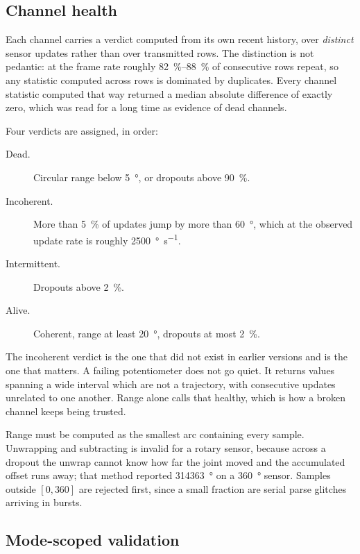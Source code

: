 \subsection{Channel health}

Each channel carries a verdict computed from its own recent history, over
\emph{distinct} sensor updates rather than over transmitted rows. The
distinction is not pedantic: at the frame rate roughly
\SIrange{82}{88}{\percent} of consecutive rows repeat, so any statistic
computed across rows is dominated by duplicates. Every channel statistic
computed that way returned a median absolute difference of exactly zero, which
was read for a long time as evidence of dead channels.

Four verdicts are assigned, in order:

\begin{description}
  \item[Dead.] Circular range below \SI{5}{\degree}, or dropouts above
    \SI{90}{\percent}.
  \item[Incoherent.] More than \SI{5}{\percent} of updates jump by more than
    \SI{60}{\degree}, which at the observed update rate is roughly
    \SI{2500}{\degree\per\second}.
  \item[Intermittent.] Dropouts above \SI{2}{\percent}.
  \item[Alive.] Coherent, range at least \SI{20}{\degree}, dropouts at most
    \SI{2}{\percent}.
\end{description}

The incoherent verdict is the one that did not exist in earlier versions and
is the one that matters. A failing potentiometer does not go quiet. It returns
values spanning a wide interval which are not a trajectory, with consecutive
updates unrelated to one another. Range alone calls that healthy, which is how
a broken channel keeps being trusted.

Range must be computed as the smallest arc containing every sample. Unwrapping
and subtracting is invalid for a rotary sensor, because across a dropout the
unwrap cannot know how far the joint moved and the accumulated offset runs
away; that method reported \SI{314363}{\degree} on a \SI{360}{\degree} sensor.
Samples outside $[0, 360]$ are rejected first, since a small fraction are
serial parse glitches arriving in bursts.

\subsection{Mode-scoped validation}

